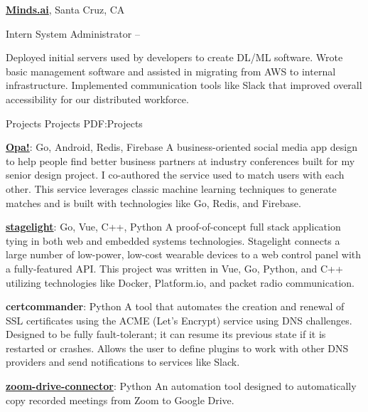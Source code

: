 \documentclass[letterpaper,MMMyyyy,nonstopmode]{simpleresumecv}
\begin{document}
\begin{Body}
\Entry
\href{https://minds.ai}
{\textbf{Minds.ai}},
Santa Cruz, CA

\Gap
\BulletItem
Intern System Administrator
\hfill
{} --
\begin{Detail}
\SubBulletItem
Deployed initial servers used by developers to create DL/ML software. Wrote basic management software and assisted in migrating from AWS to internal infrastructure.
\SubBulletItem
Implemented communication tools like Slack that improved overall accessibility for our distributed workforce.
\end{Detail}
\BigGap


\Section
{Projects}
{Projects}
{PDF:Projects}

\Entry
\href{https://github.com/opa-social}
{\textbf{Opa!}}: Go, Android, Redis, Firebase
\BulletItem
A business-oriented social media app design to help people find better business partners
at industry conferences built for my senior design project. I co-authored the service 
used to match users with each other. This service leverages classic machine learning 
techniques to generate matches and is built with technologies like Go, Redis, and Firebase.
\hfill
\BigGap

\Entry
\href{https://github.com/MrFlynn/stagelight}
{\textbf{stagelight}}: Go, Vue, C++, Python
\BulletItem
A proof-of-concept full stack application tying in both web and embedded systems technologies.
Stagelight connects a large number of low-power, low-cost wearable devices to a web control
panel with a fully-featured API. This project was written in Vue, Go, Python, and 
C++ utilizing technologies like Docker, Platform.io, and packet radio communication.
\hfill
\BigGap

\Entry
{\textbf{certcommander}}: Python
\BulletItem
A tool that automates the creation and renewal of SSL certificates using the ACME (Let's Encrypt) service using DNS challenges. Designed to be fully fault-tolerant; it can resume its previous state if it is restarted or crashes. Allows the user to define plugins to work with other DNS providers and send notifications to services like Slack.
\hfill
\BigGap

\Entry
\href{https://github.com/minds-ai/zoom-drive-connector}
{\textbf{zoom-drive-connector}}: Python
\BulletItem
An automation tool designed to automatically copy recorded meetings from Zoom to Google Drive.
\hfill
\BigGap


\end{Body}
\end{document}

